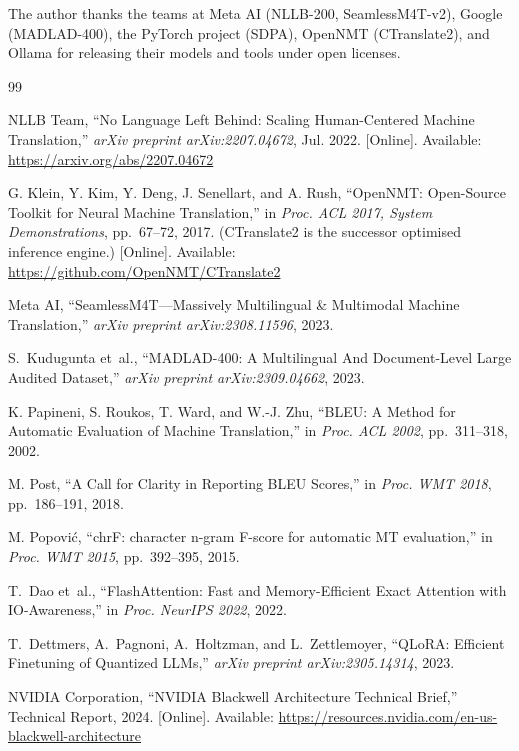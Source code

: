 \documentclass[conference]{IEEEtran}
\begin{document}
The author thanks the teams at Meta AI (NLLB-200, SeamlessM4T-v2), Google
(MADLAD-400), the PyTorch project (SDPA), OpenNMT (CTranslate2), and
Ollama for releasing their models and tools under open licenses.


\begin{thebibliography}{99}

NLLB Team, ``No Language Left Behind: Scaling Human-Centered Machine Translation,''
\textit{arXiv preprint arXiv:2207.04672}, Jul. 2022.
[Online]. Available: \url{https://arxiv.org/abs/2207.04672}

G. Klein, Y. Kim, Y. Deng, J. Senellart, and A. Rush,
``OpenNMT: Open-Source Toolkit for Neural Machine Translation,''
in \textit{Proc. ACL 2017, System Demonstrations}, pp.~67--72, 2017.
(CTranslate2 is the successor optimised inference engine.)
[Online]. Available: \url{https://github.com/OpenNMT/CTranslate2}

Meta AI,
``SeamlessM4T---Massively Multilingual \& Multimodal Machine Translation,''
\textit{arXiv preprint arXiv:2308.11596}, 2023.

S.~Kudugunta et~al.,
``MADLAD-400: A Multilingual And Document-Level Large Audited Dataset,''
\textit{arXiv preprint arXiv:2309.04662}, 2023.

K. Papineni, S. Roukos, T. Ward, and W.-J. Zhu,
``BLEU: A Method for Automatic Evaluation of Machine Translation,''
in \textit{Proc. ACL 2002}, pp.~311--318, 2002.

M. Post, ``A Call for Clarity in Reporting BLEU Scores,''
in \textit{Proc. WMT 2018}, pp.~186--191, 2018.

M. Popovi\'{c}, ``chrF: character n-gram F-score for automatic MT evaluation,''
in \textit{Proc. WMT 2015}, pp.~392--395, 2015.

T.~Dao et~al.,
``FlashAttention: Fast and Memory-Efficient Exact Attention with IO-Awareness,''
in \textit{Proc. NeurIPS 2022}, 2022.

T.~Dettmers, A.~Pagnoni, A.~Holtzman, and L.~Zettlemoyer,
``QLoRA: Efficient Finetuning of Quantized LLMs,''
\textit{arXiv preprint arXiv:2305.14314}, 2023.

NVIDIA Corporation, ``NVIDIA Blackwell Architecture Technical Brief,''
Technical Report, 2024.
[Online]. Available: \url{https://resources.nvidia.com/en-us-blackwell-architecture}


\end{thebibliography}
\end{document}
